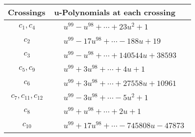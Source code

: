\documentclass[1p]{elsarticle_modified}
\theoremstyle{definition}
\begin{document}
\begin{tabular}{m{50pt}|m{274pt}}
Crossings & \hspace{64pt}u-Polynomials at each crossing \\
\hline $$\begin{aligned}c_{1},c_{4}\end{aligned}$$&$\begin{aligned}
&u^{99}- u^{98}+\cdots+23 u^2+1
\end{aligned}$\\
\hline $$\begin{aligned}c_{2}\end{aligned}$$&$\begin{aligned}
&u^{99}-17 u^{98}+\cdots-188 u+19
\end{aligned}$\\
\hline $$\begin{aligned}c_{3}\end{aligned}$$&$\begin{aligned}
&u^{99}- u^{98}+\cdots+140544 u+38593
\end{aligned}$\\
\hline $$\begin{aligned}c_{5},c_{9}\end{aligned}$$&$\begin{aligned}
&u^{99}+3 u^{98}+\cdots+4 u+1
\end{aligned}$\\
\hline $$\begin{aligned}c_{6}\end{aligned}$$&$\begin{aligned}
&u^{99}+3 u^{98}+\cdots+27558 u+10961
\end{aligned}$\\
\hline $$\begin{aligned}c_{7},c_{11},c_{12}\end{aligned}$$&$\begin{aligned}
&u^{99}-3 u^{98}+\cdots-5 u^2+1
\end{aligned}$\\
\hline $$\begin{aligned}c_{8}\end{aligned}$$&$\begin{aligned}
&u^{99}+u^{98}+\cdots+2 u+1
\end{aligned}$\\
\hline $$\begin{aligned}c_{10}\end{aligned}$$&$\begin{aligned}
&u^{99}+17 u^{98}+\cdots-745808 u-47873
\end{aligned}$\\
\hline
\end{tabular}\\~\\
\end{document}
